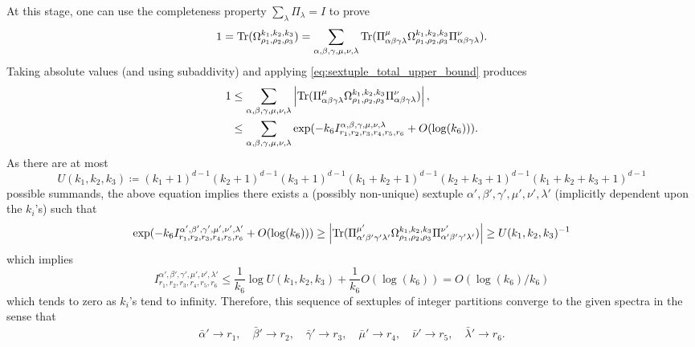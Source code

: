 \documentclass[notitlepage]{article}
\begin{document}
At this stage, one can use the completeness property $\sum_{\lambda} \Pi_{\lambda} = I$ to prove
\begin{equation}
    1 
    = \operatorname{Tr}(\Omega_{\rho_1,\rho_2,\rho_3}^{k_1, k_2, k_3})
    = \sum_{\alpha, \beta, \gamma, \mu, \nu, \lambda}\operatorname{Tr}(\Pi^{\mu}_{\alpha\beta\gamma\lambda} \Omega_{\rho_1,\rho_2,\rho_3}^{k_1, k_2, k_3} \Pi^{\nu}_{\alpha\beta\gamma\lambda}).
\end{equation}
Taking absolute values (and using subaddivity) and applying \cref{eq:sextuple_total_upper_bound} produces
\begin{align}
    1
    &\leq \sum_{\alpha, \beta, \gamma, \mu, \nu, \lambda}\left|\operatorname{Tr}(\Pi^{\mu}_{\alpha\beta\gamma\lambda} \Omega_{\rho_1,\rho_2,\rho_3}^{k_1, k_2, k_3} \Pi^{\nu}_{\alpha\beta\gamma\lambda})\right|, \\ 
    &\leq \sum_{\alpha, \beta, \gamma, \mu, \nu, \lambda} \exp( - k_6 I_{r_1, r_2, r_3, r_4, r_5, r_6}^{\alpha, \beta, \gamma, \mu, \nu, \lambda} + O(\log(k_6))).
\end{align}
As there are at most
\begin{equation}
    U(k_1, k_2, k_3) \coloneqq (k_1+1)^{d-1}(k_2+1)^{d-1}(k_3+1)^{d-1}(k_1+k_2+1)^{d-1}(k_2+k_3+1)^{d-1}(k_1+k_2+k_3+1)^{d-1}
\end{equation}
possible summands, the above equation implies there exists a (possibly non-unique) sextuple $\alpha', \beta', \gamma', \mu', \nu', \lambda'$ (implicitly dependent upon the $k_i$'s) such that
\begin{equation}
    \label{eq:occasionality_lower_bound}
    \exp( - k_6 I_{r_1, r_2, r_3, r_4, r_5, r_6}^{\alpha', \beta', \gamma', \mu', \nu', \lambda'} + O(\log(k_6))) \geq \left|\operatorname{Tr}(\Pi^{\mu'}_{\alpha'\beta'\gamma'\lambda'} \Omega_{\rho_1,\rho_2,\rho_3}^{k_1, k_2, k_3} \Pi^{\nu'}_{\alpha'\beta'\gamma'\lambda'})\right| \geq U(k_1, k_2, k_3)^{-1}
\end{equation}
which implies
\begin{equation}
    I_{r_1, r_2, r_3, r_4, r_5, r_6}^{\alpha', \beta', \gamma', \mu', \nu', \lambda'} \leq \frac{1}{k_6}\log U(k_1,k_2,k_3) + \frac{1}{k_6}O(\log(k_6)) = O(\log(k_6)/k_6)
\end{equation}
which tends to zero as $k_i$'s tend to infinity.
Therefore, this sequence of sextuples of integer partitions converge to the given spectra in the sense that
\begin{align}
    \bar \alpha' \to r_1, \quad
    \bar \beta' \to r_2, \quad
    \bar \gamma' \to r_3, \quad
    \bar \mu' \to r_4, \quad
    \bar \nu' \to r_5, \quad
    \bar \lambda' \to r_6.
\end{align}
\end{document}
